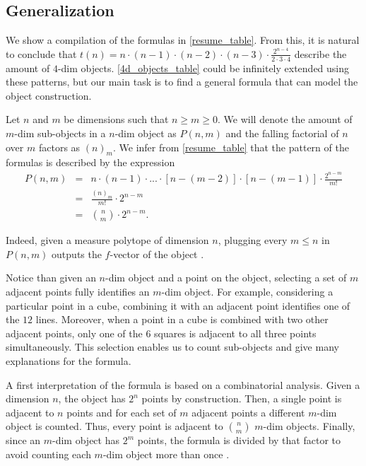 \documentclass{article}
\begin{document}
	\subsection{Generalization}
	
	We show a compilation of the formulas in \autoref{resume_table}. From this, it is natural to conclude that $t(n) = n\cdot(n-1)\cdot(n-2)\cdot(n-3)\cdot\frac{2^{n-4}}{2 \cdot 3 \cdot 4}$ describe the amount of $4$-dim objects. \autoref{4d_objects_table} could be infinitely extended using these patterns, but our main task is to find a general formula that can model the object construction.
	
	
	Let $n$ and $m$ be dimensions such that $n \geq m \geq 0$. We will denote the amount of $m$-dim sub-objects in a $n$-dim object as $P(n,m)$ and the falling factorial of $n$ over $m$ factors as $(n)_{m}$. We infer from \autoref{resume_table} that the pattern of the formulas is described by the expression
	\begin{eqnarray*}
		P(n,m) & = & n \cdot (n-1)\cdot ... \cdot [n-(m-2)] \cdot [n-(m-1)] \cdot \frac{2^{n-m}}{m!}\\
		& = & \frac{(n)_{m}}{m!} \cdot 2^{n-m}\\
		& = & \binom{n}{m}\cdot2^{n-m}.
	\end{eqnarray*}
	
	Indeed, given a measure polytope of dimension $n$, plugging every $m \leq n$ in $P(n,m)$ \cite{coxeter1973regular} outputs the $f$-vector of the object \cite{zieglerLectures}.
	
	Notice than given an $n$-dim object and a point on the object, selecting a set of $m$ adjacent points fully identifies an $m$-dim object. For example, considering a particular point in a cube, combining it with an adjacent point identifies one of the $12$ lines. Moreover, when a point in a cube is combined with two other adjacent points, only one of the $6$ squares is adjacent to all three points simultaneously. This selection enables us to count sub-objects and give many explanations for the formula.
	
	A first interpretation of the formula is based on a combinatorial analysis. Given a dimension $n$, the object has $2^{n}$ points by construction. Then, a single point is adjacent to $n$ points and for each set of $m$ adjacent points a different $m$-dim object is counted. Thus, every point is adjacent to $\binom{n}{m}$ $m$-dim objects. Finally, since an $m$-dim object has $2^{m}$ points, the formula is divided by that factor to avoid counting each $m$-dim object more than once \cite{countingHypercubes}.
	
\end{document}
